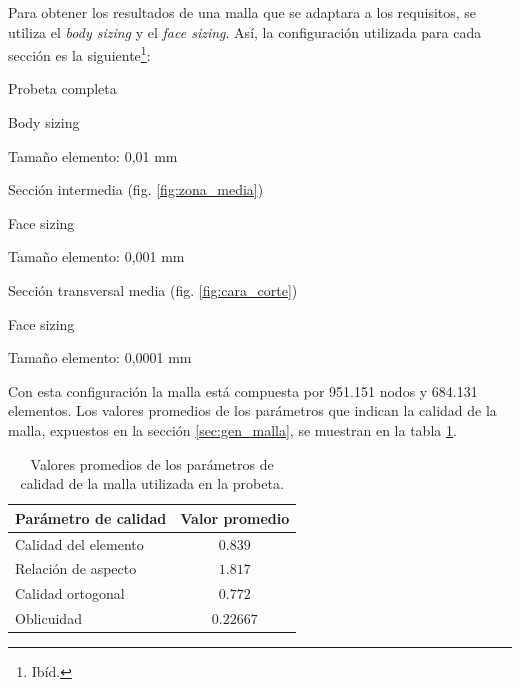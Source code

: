 Para obtener los resultados de una malla que se adaptara a los requisitos, se utiliza el \textit{body sizing} y el \textit{face sizing}. Así, la configuración utilizada para cada sección es la siguiente\footnote{Ibíd.}:
\begin{itemize*}
	\item Probeta completa
		\begin{itemize*}
			\item Body sizing
			\item Tamaño elemento: 0,01 mm
		\end{itemize*}
	\item Sección intermedia (fig. \ref{fig:zona_media})
		\begin{itemize*}
			\item Face sizing
			\item Tamaño elemento: 0,001 mm
		\end{itemize*}
	\item Sección transversal media (fig. \ref{fig:cara_corte})
		\begin{itemize*}
			\item Face sizing
			\item Tamaño elemento: 0,0001 mm
		\end{itemize*}
\end{itemize*}

Con esta configuración la malla está compuesta por 951.151 nodos y 684.131 elementos. Los valores promedios de los parámetros que indican la calidad de la malla, expuestos en la sección \ref{sec:gen_malla}, se muestran en la tabla \ref{tab:cal_malla}.
\begin{table}[h]
\centering
\begin{tabular}{@{}lc@{}}
\toprule
Parámetro de calidad & Valor promedio \\ \midrule
Calidad del elemento & $0.839$ \\
Relación de aspecto & $1.817$ \\
Calidad ortogonal & $0.772$ \\
Oblicuidad & $0.22667$ \\ \bottomrule
\end{tabular}
\caption{Valores promedios de los parámetros de calidad de la malla utilizada en la probeta.}
\label{tab:cal_malla}
\end{table}

